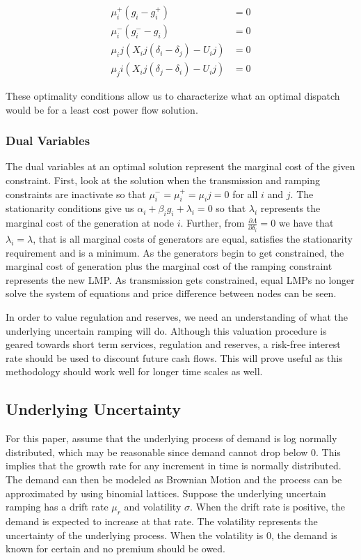\begin{align}
\mu_i^+  (g_i-g_i^+ )&=0	\\
\mu_i^- (g_i^--g_i )&=0	\\
\mu_ij (X_ij (\delta_i-\delta_j )-U_ij )&=0	\\
\mu_ji (X_ij (\delta_j-\delta_i )-U_ij )&=0
\end{align}

These optimality conditions allow us to characterize what an optimal dispatch would be for a least cost power flow solution.

\subsubsection{Dual Variables}
	The dual variables at an optimal solution represent the marginal cost of the given constraint.  First, look at the solution when the transmission and ramping constraints are inactivate so that $\mu_i^-=\mu_i^+=\mu_ij=0$ for all $i$ and $j$.  The stationarity conditions give us $\alpha_i+ \beta_i g_i+ \lambda_i=0$ so that $\lambda_i$ represents the marginal cost of the generation at node $i$.  Further, from $\frac{\partial \Lambda}{\partial \delta_i}=0$ we have that $\lambda_i=\lambda$, that is all marginal costs of generators are equal, satisfies the stationarity requirement and is a minimum.  As the generators begin to get constrained, the marginal cost of generation plus the marginal cost of the ramping constraint represents the new LMP.  As transmission gets constrained, equal LMPs no longer solve the system of equations and price difference between nodes can be seen.

	In order to value regulation and reserves, we need an understanding of what the underlying uncertain ramping will do.  Although this valuation procedure is geared towards short term services, regulation and reserves, a risk-free interest rate should be used to discount future cash flows.  This will prove useful as this methodology should work well for longer time scales as well.  

\subsection{Underlying Uncertainty}
For this paper, assume that the underlying process of demand is log normally distributed, which may be reasonable since demand cannot drop below 0.  This implies that the growth rate for any increment in time is normally distributed.  The demand can then be modeled as Brownian Motion and the process can be approximated by using binomial lattices.  Suppose the underlying uncertain ramping has a drift rate $\mu_r$ and volatility $\sigma$.  When the drift rate is positive, the demand is expected to increase at that rate.  The volatility represents the uncertainty of the underlying process.  When the volatility is 0, the demand is known for certain and no premium should be owed.    

